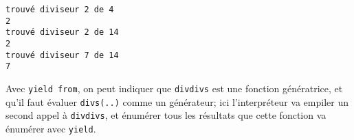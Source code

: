     \begin{Verbatim}[commandchars=\\\{\},frame=single,framerule=0.3mm,rulecolor=\color{cellframecolor}]
trouvé diviseur 2 de 4
2
trouvé diviseur 2 de 14
2
trouvé diviseur 7 de 14
7
\end{Verbatim}

    Avec \texttt{yield\ from}, on peut indiquer que \texttt{divdivs} est une
fonction génératrice, et qu'il faut évaluer \texttt{divs(..)} comme un
générateur; ici l'interpréteur va empiler un second appel à
\texttt{divdivs}, et énumérer tous les résultats que cette fonction va
énumérer avec \texttt{yield}.


    
    
    

